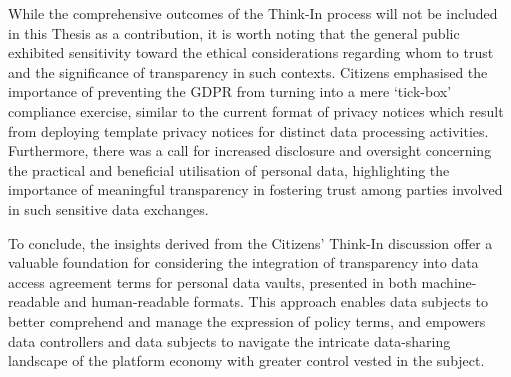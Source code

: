 While the comprehensive outcomes of the Think-In process will not be included in this Thesis as a contribution, it is worth noting that the general public exhibited sensitivity toward the ethical considerations regarding whom to trust and the significance of transparency in such contexts.
Citizens emphasised the importance of preventing the GDPR from turning into a mere `tick-box' compliance exercise, similar to the current format of privacy notices which result from deploying template privacy notices for distinct data processing activities.
Furthermore, there was a call for increased disclosure and oversight concerning the practical and beneficial utilisation of personal data, highlighting the importance of meaningful transparency in fostering trust among parties involved in such sensitive data exchanges.

To conclude, the insights derived from the Citizens' Think-In discussion offer a valuable foundation for considering the integration of transparency into data access agreement terms for personal data vaults, presented in both machine-readable and human-readable formats.
This approach enables data subjects to better comprehend and manage the expression of policy terms, and empowers data controllers and data subjects to navigate the intricate data-sharing landscape of the platform economy with greater control vested in the subject.

